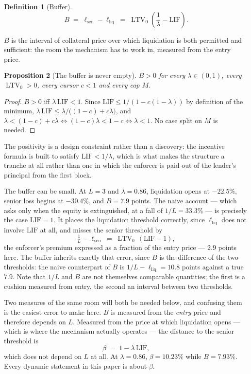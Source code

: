 \documentclass[11pt,a4paper]{article}
\theoremstyle{plain}
\newtheorem{proposition}{Proposition}
\theoremstyle{definition}
\newtheorem{definition}[proposition]{Definition}
\theoremstyle{remark}
\newcommand{\LIF}{\mathrm{LIF}}
\DeclareMathOperator{\ltv}{LTV}
\begin{document}
\begin{definition}[Buffer]
\[
  B \;=\; \ell_{\mathrm{sen}}-\ell_{\mathrm{liq}} \;=\; \ltv_0\left(\frac{1}{\lambda}-\LIF\right).
\]
\end{definition}

$B$ is the interval of collateral price over which liquidation is both permitted and sufficient:
the room the mechanism has to work in, measured from the entry price.

\begin{proposition}[The buffer is never empty]\label{prop:bpos}
$B>0$ for every $\lambda\in(0,1)$, every $\ltv_0>0$, every cursor $c<1$ and every cap $M$.
\end{proposition}

\begin{proof}
$B>0$ iff $\lambda\,\LIF<1$. Since $\LIF \leq 1/(1-c(1-\lambda))$ by definition of the minimum,
$\lambda\,\LIF \leq \lambda/\bigl((1-c)+c\lambda\bigr)$, and
$\lambda < (1-c)+c\lambda \iff (1-c)\lambda < 1-c \iff \lambda<1$. No case split on $M$ is needed.
\end{proof}

The positivity is a design constraint rather than a discovery: the incentive formula is built to
satisfy $\LIF < 1/\lambda$, which is what makes the structure a tranche at all rather than one in
which the enforcer is paid out of the lender's principal from the first block.

The buffer can be small. At $L=3$ and $\lambda=0.86$, liquidation opens at $-22.5\%$, senior loss
begins at $-30.4\%$, and $B=7.9$ points. The naive account --- which asks only when the equity is
extinguished, at a fall of $1/L=33.3\%$ --- is precisely the case $\LIF=1$. It places the
liquidation threshold correctly, since $\ell_{\mathrm{liq}}$ does not involve $\LIF$ at all, and
misses the senior threshold by
\[
  \tfrac{1}{L}-\ell_{\mathrm{sen}} \;=\; \ltv_0\,(\LIF-1),
\]
the enforcer's premium expressed as a fraction of the entry price --- $2.9$ points here. The
buffer inherits exactly that error, since $B$ is the difference of the two thresholds: the naive
counterpart of $B$ is $1/L-\ell_{\mathrm{liq}} = 10.8$ points against a true $7.9$. Note that
$1/L$ and $B$ are not themselves comparable quantities; the first is a cushion measured from
entry, the second an interval between two thresholds.

Two measures of the same room will both be needed below, and confusing them is the easiest error
to make here. $B$ is measured from the \emph{entry} price and therefore depends on $L$. Measured
from the price at which liquidation opens --- which is where the mechanism actually operates ---
the distance to the senior threshold is
\begin{equation}\label{eq:beta}
  \beta \;=\; 1-\lambda\,\LIF,
\end{equation}
which does not depend on $L$ at all. At $\lambda=0.86$, $\beta = 10.23\%$ while $B = 7.93\%$.
Every dynamic statement in this paper is about $\beta$.
\end{document}
